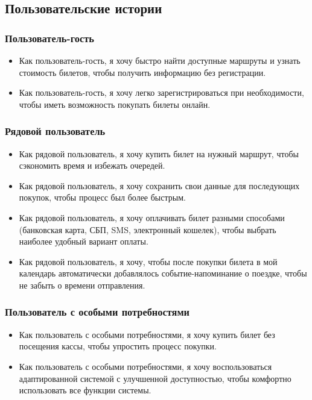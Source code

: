 \subsection{Пользовательские истории}

\subsubsection*{Пользователь-гость}
\begin{itemize}
    \item Как пользователь-гость, я хочу быстро найти доступные маршруты и узнать стоимость билетов, чтобы получить информацию без регистрации.
    \item Как пользователь-гость, я хочу легко зарегистрироваться при необходимости, чтобы иметь возможность покупать билеты онлайн.
\end{itemize}

\subsubsection*{Рядовой пользователь}
\begin{itemize}
    \item Как рядовой пользователь, я хочу купить билет на нужный маршрут, чтобы сэкономить время и избежать очередей.
    \item Как рядовой пользователь, я хочу сохранить свои данные для последующих покупок, чтобы процесс был более быстрым.
    \item Как рядовой пользователь, я хочу оплачивать билет разными способами (банковская карта, СБП, SMS, электронный кошелек), чтобы выбрать наиболее удобный вариант оплаты.
    \item Как рядовой пользователь, я хочу, чтобы после покупки билета в мой календарь автоматически добавлялось событие-напоминание о поездке, чтобы не забыть о времени отправления.
\end{itemize}

\subsubsection*{Пользователь с особыми потребностями}
\begin{itemize}
    \item Как пользователь с особыми потребностями, я хочу купить билет без посещения кассы, чтобы упростить процесс покупки.
    \item Как пользователь с особыми потребностями, я хочу воспользоваться адаптированной системой с улучшенной доступностью, чтобы комфортно использовать все функции системы.
\end{itemize}

